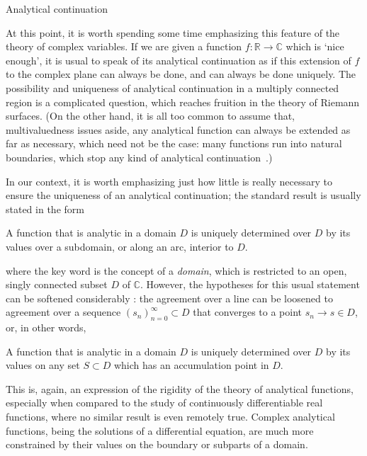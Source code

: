 \begin{mathaside}{Analytical continuation}
\label{aside.analytical-continuation}

At this point, it is worth spending some time emphasizing this feature of the theory of complex variables. If we are given a function $f:\mathbb{R}\to \mathbb{C}$ which is `nice enough', it is usual to speak of its analytical continuation as if this extension of $f$ to the complex plane can always be done, and can always be done uniquely. The possibility and uniqueness of analytical continuation in a multiply connected region is a complicated question, which reaches fruition in the theory of Riemann surfaces. (On the other hand, it is all too common to assume that, multivaluedness issues aside, any analytical function can always be extended as far as necessary, which need not be the case: many functions run into natural boundaries, which stop any kind of analytical continuation~\cite[p.~191]{noguchi_complex_analysis}.)

\vspace{\maskip}
In our context, it is worth emphasizing just how little is really necessary to ensure the uniqueness of an analytical continuation; the standard result \cite[given e.g. in Ref.][pp.~283ff]{churchill_complex_variables} is usually stated in the form

\begin{theorem}
A function that is analytic in a domain $D$ is uniquely determined over $D$ by its values over a subdomain, or along an arc, interior to $D$.
\end{theorem}


where the key word is the concept of a \textit{domain}, which is restricted to an open, singly connected subset $D$ of $\mathbb{C}$. However, the hypotheses for this usual statement can be softened considerably \cite[p.~95]{noguchi_complex_analysis}: the agreement over a line can be loosened to agreement over a sequence $(s_n)_{n=0}^\infty \subset D$ that converges to a point $s_n\to s\in D$, or, in other words,

\begin{theorem}
A function that is analytic in a domain $D$ is uniquely determined over $D$ by its values on any set $S\subset D$ which has an accumulation point in $D$.
\end{theorem}


This is, again, an expression of the rigidity of the theory of analytical functions, especially when compared to the study of continuously differentiable real functions, where no similar result is even remotely true. Complex analytical functions, being the solutions of a differential equation, are much more constrained by their values on the boundary or subparts of a domain.

\end{mathaside}




